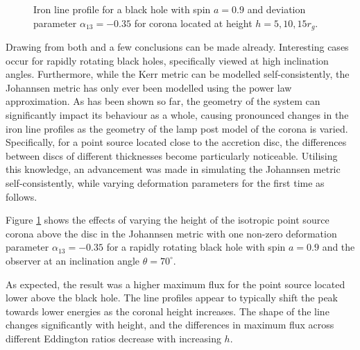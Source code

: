 \documentclass[fleqn,usenatbib,useAMS]{mnras}
\begin{document}
\begin{figure}
    \caption{Iron line profile for a black hole with spin $a = 0.9$ and deviation parameter $\alpha_{13} = -0.35$ for corona located at height $h = 5, 10, 15  r_{g}$.}
    \label{johannsen_selfconsistent}
\end{figure}

Drawing from both \cite{abdikamalov2020testing} and \cite{taylor2018exploring} a few conclusions can be made already. Interesting cases occur for rapidly rotating black holes, specifically viewed at high inclination angles. Furthermore, while the Kerr metric can be modelled self-consistently, the Johannsen metric \cite{johannsen2013regular} has only ever been modelled using the power law approximation. As has been shown so far, the geometry of the system can significantly impact its behaviour as a whole, causing pronounced changes in the iron line profiles as the geometry of the lamp post model of the corona is varied. Specifically, for a point source located close to the accretion disc, the differences between discs of different thicknesses become particularly noticeable. 
Utilising this knowledge, an advancement was made in simulating the Johannsen metric self-consistently, while varying deformation parameters for the first time as follows.


Figure \ref{johannsen_selfconsistent} shows the effects of varying the height of the isotropic point source corona above the disc in the Johannsen metric with one non-zero deformation parameter $\alpha_{13} = -0.35$ for a rapidly rotating black hole with spin $a = 0.9$ and the observer at an inclination angle $\theta = 70^{\circ}$. 

As expected, the result was a higher maximum flux for the point source located lower above the black hole. The line profiles appear to typically shift the peak towards lower energies as the coronal height increases. The shape of the line changes significantly with height, and the differences in maximum flux across different Eddington ratios decrease with increasing $h$.
\end{document}
